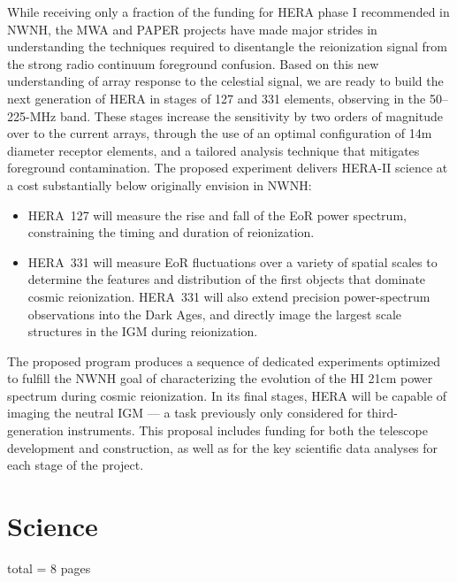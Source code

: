 \documentclass[preprint]{aastex}
\begin{document}
While receiving only a fraction of the funding for HERA phase I
recommended in NWNH, the MWA and PAPER projects have made
major strides in understanding the techniques required to disentangle
the reionization signal from the strong radio continuum foreground
confusion. Based on this new understanding of array response to the
celestial signal, we are ready to build the next generation of HERA in
stages of 127 and 331 elements, observing in the 50--225-MHz band.
These stages increase the sensitivity by two orders of
magnitude over to the current arrays, through the use of an
optimal configuration of 14m diameter receptor elements, and a
tailored analysis technique that mitigates foreground contamination.
The proposed experiment delivers HERA-II science at a cost
substantially below originally envision in NWNH:


\vspace{-4pt}
\begin{itemize}\setlength{\parskip}{0pt}\itemsep0pt

\item HERA~127 will measure the rise and fall of the EoR power
spectrum, constraining the timing and duration of reionization.

\item HERA~331 will measure EoR fluctuations over a variety of spatial
scales to determine the features and distribution of the first objects
that dominate cosmic reionization. HERA~331 will also extend precision
power-spectrum observations into the Dark Ages, and directly image the
largest scale structures in the IGM during reionization.

\end{itemize}
\vspace{-4pt}

The proposed program produces a sequence of dedicated experiments
optimized to fulfill the NWNH goal of characterizing the evolution of
the HI 21cm power spectrum during cosmic reionization. In
its final stages, HERA will be capable of imaging the neutral
IGM --- a task previously only considered for third-generation
instruments. This proposal includes funding for both the
telescope development and construction, as well as for the key
scientific data analyses for each stage of the project.

\section{Science} total = 8 pages
\end{document}
